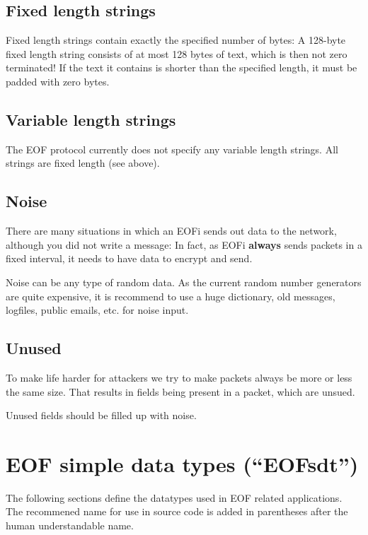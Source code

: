 \documentclass[12pt,a4paper]{book}
\begin{document}
\subsection{Fixed length strings}
Fixed length strings contain exactly the specified number of bytes:
A 128-byte fixed length string consists of at most 128 bytes of text,
which is then not zero terminated!
If the text it contains is shorter than the specified length,
it must be padded with zero bytes.
\subsection{Variable length strings}
The EOF protocol currently does not specify any variable length strings.
All strings are fixed length (see above).
\subsection{Noise}
There are many situations in which an EOFi sends out data to the network,
although you did not write a message: In fact, as EOFi \textbf{always}
sends packets in a fixed interval, it needs to have data to encrypt and send.

Noise can be any type of random data. As the current random number generators
are quite expensive, it is recommend to use a huge dictionary, old
messages, logfiles, public emails, etc. for noise input.

\subsection{Unused}
To make life harder for attackers we try to make packets always be more or
less the same size. That results in fields being present in a packet, which
are unsued.

Unused fields should be filled up with noise.
\section{EOF simple data types ("`EOFsdt"')}
The following sections define the datatypes used in EOF related
applications. The recommened name for use in source
code is added in parentheses after the human understandable name.
\end{document}
